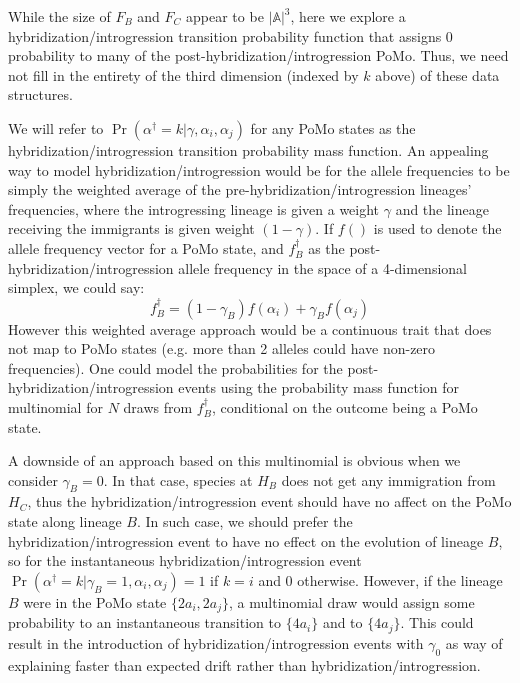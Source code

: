 \documentclass{article}
\begin{document}
While the size of $F_B$ and $F_C$ appear to be $|\mathbb{A}|^3$, here we explore a hybridization/introgression transition probability function that assigns 0 probability to many of the post-hybridization/introgression PoMo.
Thus, we need not fill in the entirety of the third dimension (indexed by $k$ above) of these data structures.

We will refer to $\Pr\left(\alpha^{\dag}=k | \gamma, \alpha_i, \alpha_j\right)$ for any PoMo states as the hybridization/introgression transition probability mass function.
An appealing way to model hybridization/introgression would be for the allele frequencies to be simply the
weighted average of the pre-hybridization/introgression lineages' frequencies, where the introgressing lineage
is given a weight $\gamma$ and the lineage receiving the immigrants is given weight $(1-\gamma)$.
If $f()$ is used to denote the allele frequency vector for a PoMo state, and $f^{\dag}_B$ as the post-hybridization/introgression allele frequency in the space of a 4-dimensional simplex, we could say:
\begin{equation}
f^{\dag}_B = \left(1-\gamma_B\right) f(\alpha_i) + \gamma_B f(\alpha_j)
\end{equation}
However this weighted average approach would be a continuous trait that does not map to PoMo states (e.g. more than 2 alleles could have non-zero frequencies).
One could model the probabilities for the post-hybridization/introgression events using the probability mass function for multinomial for $N$ draws from $f^{\dag}_B$, conditional on the outcome being a PoMo state.

A downside of an approach based on this multinomial is obvious when we consider $\gamma_B=0$.
In that case, species  at $H_B$ does not get any immigration from $H_C$, thus the hybridization/introgression event should have no affect on the PoMo state along lineage $B$.
In such case, we should prefer the hybridization/introgression event to have no effect on the evolution of lineage $B$, so for the instantaneous hybridization/introgression event $\Pr\left(\alpha^{\dag}=k | \gamma_B=1, \alpha_i, \alpha_j\right)= 1$ if $k=i$ and 0 otherwise.
However, if the lineage $B$ were in the PoMo state $\{2a_i, 2a_j\}$, a multinomial draw would assign some probability to an instantaneous transition to $\{4a_i\}$ and to $\{4a_j\}$.
This could result in the introduction of hybridization/introgression events with $\gamma_0$ as way of explaining faster than expected drift rather than hybridization/introgression.
\end{document}
